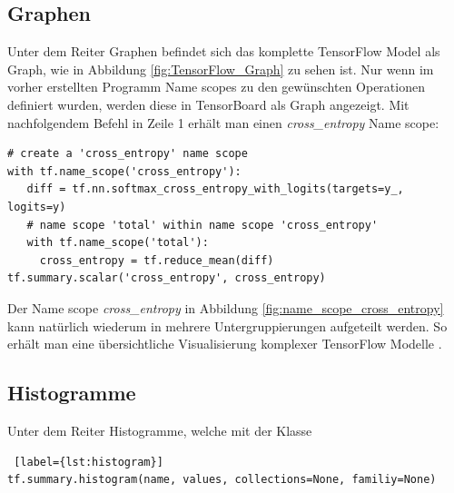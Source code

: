 \subsection{Graphen} \label{sub:tb-graph}

\vspace{8pt}
Unter dem Reiter Graphen befindet sich das komplette TensorFlow Model als Graph,  wie in Abbildung \ref{fig:TensorFlow_Graph} zu sehen ist. Nur wenn im vorher erstellten Programm Name scopes zu den gewünschten Operationen definiert wurden, werden diese in TensorBoard als Graph angezeigt. Mit nachfolgendem Befehl in Zeile 1 erhält man einen \textit{cross\_entropy} Name scope: 

\vspace{0.2cm}
\begin{minipage}{\linewidth}
\begin{lstlisting}[label={lst:graph}, caption={Erstellen verschachtelter Name scopes}]
# create a 'cross_entropy' name scope
with tf.name_scope('cross_entropy'):
   diff = tf.nn.softmax_cross_entropy_with_logits(targets=y_, logits=y)
   # name scope 'total' within name scope 'cross_entropy'
   with tf.name_scope('total'):
     cross_entropy = tf.reduce_mean(diff)
tf.summary.scalar('cross_entropy', cross_entropy)
\end{lstlisting}
\end{minipage}
\vspace{0.3cm}

Der Name scope \textit{cross\_entropy} in Abbildung \ref{fig:name_scope_cross_entropy} kann natürlich wiederum in mehrere Untergruppierungen aufgeteilt werden. So erhält man eine übersichtliche Visualisierung komplexer TensorFlow Modelle \cite{tensorboard.2017}.






\subsection{Histogramme}
\vspace{10pt}
Unter dem Reiter Histogramme, welche mit der Klasse
\\

\begin{minipage}{\linewidth}
\begin{lstlisting} [label={lst:histogram}]
tf.summary.histogram(name, values, collections=None, familiy=None)
\end{lstlisting}
\end{minipage}
\vspace{0.2cm}



